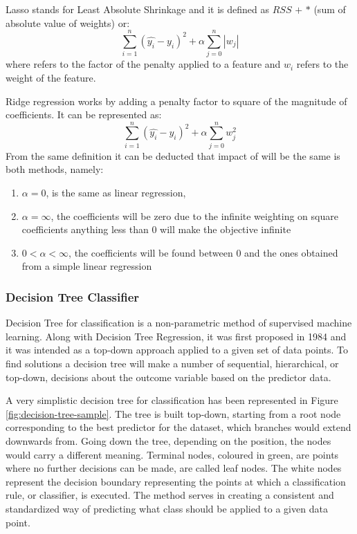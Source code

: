 Lasso stands for Least Absolute Shrinkage and it is defined as $RSS$ $+$ \textalpha{} $*$ (sum of absolute value of weights) or:
\begin{equation}\label{eq_lasso}
\sum^n_{i=1}(\hat{y_i}- y_i)^2 + \alpha \sum^n_{j=0}|w_j|
\end{equation}
where \textalpha{} refers to the factor of the penalty applied to a feature and $w_i$ refers to the weight of the feature\cite{Hastie2009SpringerOfLasso}.

Ridge regression works by adding a penalty factor to square of the magnitude of coefficients\cite{Hastie2009SpringerOfRidge}. It can be represented as:
\begin{equation}\label{eq_ridge}
\sum^n_{i=1}(\hat{y_i}- y_i)^2 + \alpha \sum^n_{j=0}w_j^2
\end{equation}
From the same definition it can be deducted that impact of \textalpha{} will be the same is both methods, namely:
\begin{enumerate}\label{list:impact-of-alpha}
\itemsep0em
\item\label{it:item1} $\alpha = 0$, is the same as linear regression, 
\item\label{it:item2} $\alpha = \infty$, the coefficients will be zero due to the infinite weighting on square coefficients anything less than 0 will make the objective infinite
\item\label{it:item3} $0 < \alpha < \infty$, the coefficients will be found between 0 and the ones obtained from a simple linear regression
\end{enumerate}

\subsubsection{Decision Tree Classifier}
Decision Tree for classification is a non-parametric method of supervised machine learning. Along with Decision Tree Regression, it was first proposed in 1984\cite{breimanCart1984} and it was intended as a top-down approach applied to a given set of data points. To find solutions a decision tree will make a number of sequential, hierarchical, or top-down, decisions about the outcome variable based on the predictor data. 

A very simplistic decision tree for classification has been represented in Figure \ref{fig:decision-tree-sample}. The tree is built top-down, starting from a root node corresponding to the best predictor for the dataset, which branches would extend downwards from. Going down the tree, depending on the position, the nodes would carry a different meaning. Terminal nodes, coloured in green, are points where no further decisions can be made, are called leaf nodes. The white nodes represent the decision boundary representing the points at which a classification rule, or classifier, is executed. The method serves in creating a consistent and standardized way of predicting what class should be applied to a given data point.

